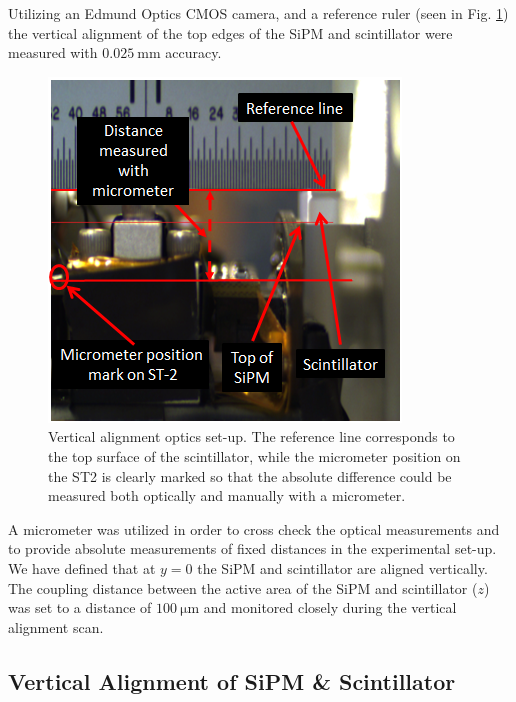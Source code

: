 Utilizing an Edmund Optics CMOS camera, and a reference ruler (seen in Fig. \ref{fig:sipm_va_optics}) the vertical alignment of the top edges of the SiPM and scintillator were measured with $\mathrm{0.025~mm}$ accuracy.
\begin{figure}[!htb]
	\centering
	\includegraphics[width=1.0\columnwidth]{misalignment/figs/sipm_va_optics}
	\caption{Vertical alignment optics set-up.  The reference line corresponds to the top surface of the scintillator, while the micrometer position on the ST2 is clearly marked so that the absolute difference could be measured both optically and manually with a micrometer.}
	\label{fig:sipm_va_optics}
\end{figure}
A micrometer was utilized in order to cross check the optical measurements and to provide absolute measurements of fixed distances in the experimental set-up.  We have defined that at $y = 0$ the SiPM and scintillator are aligned vertically.  The coupling distance between the active area of the SiPM and scintillator ($z$) was set to a distance of $\mathrm{100\ \mu m}$ and monitored closely during the vertical alignment scan.

\subsection{Vertical Alignment of SiPM \& Scintillator}
\label{sec:misalign_vert}

